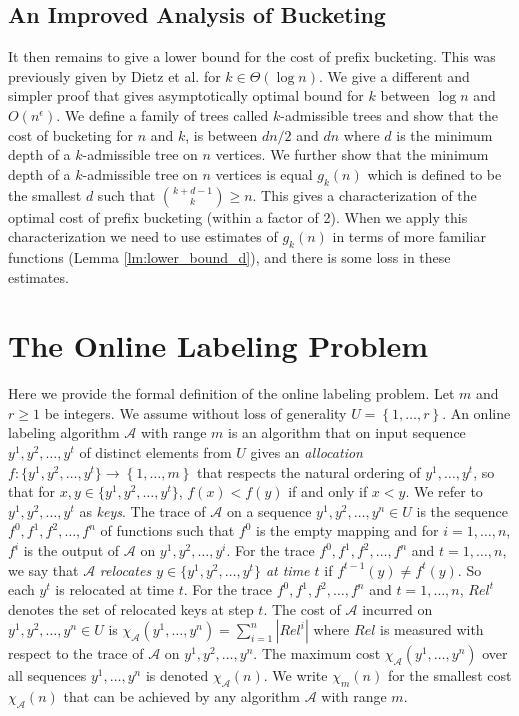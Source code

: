 \documentclass[11pt]{article}
\newcommand{\A}{\mathcal{A}}
\newcommand{\natInt}[2]{ \left\{ #1, \dotsc, #2 \right\} }
\begin{document}
\subsection{An Improved Analysis of Bucketing}

It then remains to give a lower bound
for the cost of prefix bucketing.  This was previously given by Dietz et al. \cite{DSZ04} for $k\in \Theta(\log n)$.
We give a different and simpler proof that gives asymptotically optimal bound for $k$ between $\log n$ and $O(n^\epsilon)$.
We define a family of trees called $k$-admissible trees and show that the cost
of bucketing  for $n$ and $k$, is between $dn/2$ and $dn$ where $d$ is the minimum depth of a $k$-admissible tree
on $n$ vertices.  We further show that the minimum depth of a $k$-admissible tree on $n$ vertices
is equal $g_k(n)$ which is defined to be the smallest $d$ such that $\binom{k+d-1}{k} \geq n$.
This gives a  characterization of the optimal cost of prefix bucketing (within a factor of 2).  When we apply
this characterization we need to use estimates of $g_k(n)$ in terms of more familiar functions (Lemma \ref{lm:lower_bound_d}),
and there is some loss in these estimates.

\section{The Online Labeling Problem}\label{s-olp}

Here we provide the formal definition of the online labeling problem.
Let $m$ and $r\ge 1$ be integers. We assume without loss of generality $U=\natInt{1}{r}$.
An online labeling algorithm $\A$ with range $m$ is an algorithm that on input sequence $y^1,y^2,\dotsc,y^t$ of distinct elements
from $U$ gives
an \emph{allocation $f : \{y^1,y^2,\dotsc,y^t\} \rightarrow \natInt{1}{m}$} that respects the natural ordering of $y^1,\dotsc,y^t$, so that
for $x,y\in \{y^1,y^2,\dotsc,y^t\}$, $f(x) < f(y)$ if and only if $x < y$. We refer to $y^1,y^2,\dotsc,y^t$
as \emph{keys}. The trace of $\A$ on a sequence $y^1,y^2,\dotsc,y^n\in U$ is the sequence $f^0,f^1,f^2,\dotsc,f^n$ of functions
such that $f^0$ is the empty mapping and for $i=1,\dotsc,n$, $f^i$ is the output of $\A$ on $y^1,y^2,\dotsc,y^i$.
For the trace $f^0,f^1,f^2,\dotsc,f^n$ and $t=1,\dotsc,n$, we say that $\A$ \emph{relocates $y\in \{y^1,y^2,\dotsc,y^t\}$ at time $t$}
if $f^{t-1}(y)\not=f^t(y)$. So each $y^t$ is relocated at time $t$.
For the trace $f^0,f^1,f^2,\dotsc,f^n$ and $t=1,\dotsc,n$, $Rel^t$ denotes the set of relocated keys at step $t$.
The cost of $\A$ incurred on $y^1,y^2,\dotsc,y^n\in U$ is $\chi_\A(y^1,\dotsc,y^n)=\sum_{i=1}^n |Rel^i|$ where $Rel$ is
measured with respect to the trace of $\A$ on $y^1,y^2,\dotsc,y^n$. The maximum cost
$\chi_\A(y^1,\dotsc,y^n)$ over all sequences $y^1,\dotsc,y^n$ is denoted $\chi_\A(n)$. We write $\chi_m(n)$ for the smallest cost $\chi_\A(n)$ that
can be achieved by any algorithm $\A$ with range $m$.
\end{document}
